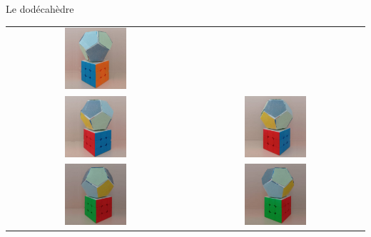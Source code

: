 \begin{frame}{Le dodécahèdre}
\begin{minipage}{0.40\textwidth}
\begin{tabular}{cc}
        \includegraphics[width=0.36\textwidth]{capture/dodecf3.jpg} \\
        \includegraphics[width=0.36\textwidth]{capture/dodecf4.jpg} &
        \includegraphics[width=0.36\textwidth]{capture/dodecf5.jpg} \\
        \includegraphics[width=0.36\textwidth]{capture/dodecf6.jpg} &
        \includegraphics[width=0.36\textwidth]{capture/dodecf7.jpg} \\

\end{tabular}
\end{minipage}
\end{frame}
